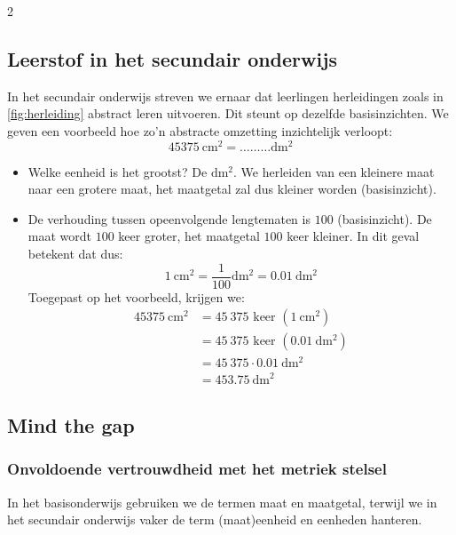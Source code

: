 \begin{multicols}{2}
    
\subsection{Leerstof in het secundair onderwijs}



In het secundair onderwijs streven we ernaar dat leerlingen herleidingen zoals in \autoref{fig:herleiding} abstract leren uitvoeren.
Dit steunt op dezelfde basisinzichten.
We geven een voorbeeld hoe zo'n abstracte omzetting inzichtelijk verloopt:
\[
\SI{45375}{\centi\metre\squared} = \ldots\ldots\ldots\si{\deci\metre\squared}
\]
\begin{itemize}
    \item Welke eenheid is het grootst? De \(\si{\deci\metre\squared}\).
    We herleiden van een kleinere maat naar een grotere maat, het maatgetal zal dus kleiner worden (basisinzicht).
    \item De verhouding tussen opeenvolgende lengtematen is \(100\) (basisinzicht).
    De maat wordt \(100\) keer groter, het maatgetal \(100\) keer kleiner.
    In dit geval betekent dat dus:
    \[
    \SI{1}{\centi\metre\squared} = \frac{1}{100}\si{\deci\metre\squared} = \SI{0.01}{\deci\metre\squared}
    \]
    Toegepast op het voorbeeld, krijgen we:
    \begin{align*}
        \SI{45375}{\centi\metre\squared} &= 45~375\text{ keer } \left(\SI{1}{\centi\metre\squared}\right)\\
        &= 45~375\text{ keer } \left(\SI{0.01}{\deci\metre\squared}\right)\\
        &= 45~375 \cdot\SI{0.01}{\deci\metre\squared}\\
        &= \SI{453.75}{\deci\metre\squared}
    \end{align*}
\end{itemize}
\subsection{Mind the gap}

\subsubsection*{Onvoldoende vertrouwdheid met het metriek stelsel}\label{onvoldoende-vertrouwdheid-met-het-metriek-stelsel}

In het basisonderwijs gebruiken we de termen maat en maatgetal, terwijl we in het secundair onderwijs vaker de term (maat)eenheid en eenheden hanteren.


\end{multicols}
